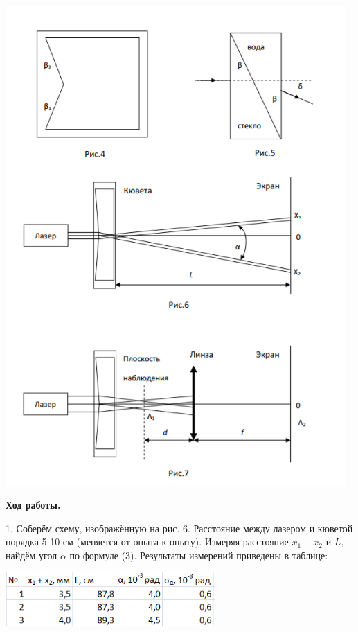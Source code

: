\documentclass[12pt]{article}
\begin{document}
\begin{center}
    	\includegraphics[width=13cm]{theory6.png}\\
    \end{center}
    
    \begin{center}
    	\textbf{\large Ход работы.}
    \end{center}
    
    1. Соберём схему, изображённую на рис. 6. Расстояние между лазером и кюветой порядка 5-10 см (меняется от опыта к опыту). Измеряя расстояние $x_1 + x_2$ и $L$, найдём угол $\alpha$ по формуле (3). Результаты измерений приведены в таблице:
    
    \begin{center}
    	\includegraphics[width=8cm]{table1.png}
    \end{center}
    
\end{document}
